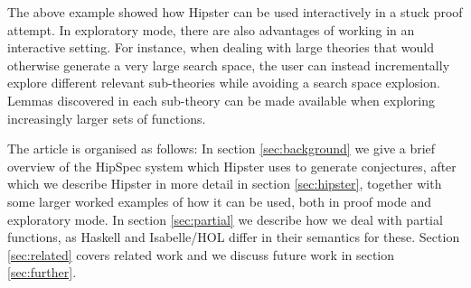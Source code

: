 The above example showed how Hipster can be used interactively in a stuck proof attempt. In exploratory mode, there are also advantages of working in an interactive setting. For instance, when dealing with large theories that would otherwise generate a very large search space, the user can instead incrementally explore different relevant sub-theories while avoiding a search space explosion. Lemmas discovered in each sub-theory can be made available when exploring increasingly larger sets of functions. 

The article is organised as follows: In section \ref{sec:background} we give a brief overview of the HipSpec system which Hipster uses to generate conjectures, after which we describe Hipster in more detail in section \ref{sec:hipster}, together with some larger worked examples of how it can be used, both in proof mode and exploratory mode. In section \ref{sec:partial} we describe how we deal with partial functions, as Haskell and Isabelle/HOL differ in their semantics for these. Section \ref{sec:related} covers related work and we discuss future work in section \ref{sec:further}.
